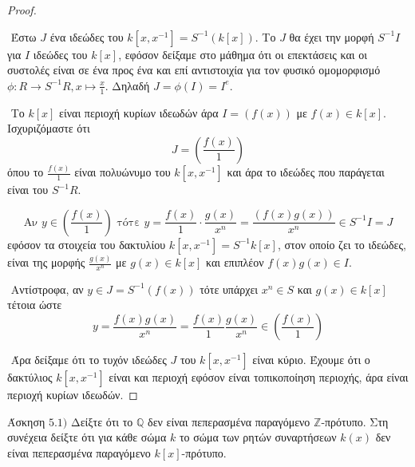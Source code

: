 \documentclass[oneside,a4paper]{article}
\begin{document}
\begin{proof} $ $
	
	$ $\newline
	Έστω $J$ ένα ιδεώδες του $k[x,x^{-1}] = S^{-1}(k[x])$. Το $J$ θα έχει την μορφή $S^{-1}I$ για $I$ ιδεώδες του $k[x]$, εφόσον δείξαμε στο μάθημα ότι οι επεκτάσεις και οι συστολές είναι σε ένα προς ένα και επί αντιστοιχία για τον φυσικό ομομορφισμό $\phi : R \rightarrow S^{-1}R, x \mapsto \frac x1$. Δηλαδή $J = \phi(I) = I^{e}$.

	$ $\newline
	Το $k[x]$ είναι περιοχή κυρίων ιδεωδών άρα $I = (f(x))$ με $f(x) \in k[x]$. Ισχυριζόμαστε ότι 
	$$J = \left(\frac{f(x)}{1}\right)$$
	όπου το $\frac{f(x)}{1}$ είναι πολυώνυμο του $k[x,x^{-1}]$ και άρα το ιδεώδες που παράγεται είναι του $S^{-1}R$.

	$$\text{Aν } y \in \left(\frac{f(x)}{1}\right) \text{ τότε }  y = \frac{f(x)}1 \cdot \frac{g(x)}{x^n} = \frac{\left(f(x)g(x)\right)}{x^n} \in S^{-1} I = J$$
	εφόσον τα στοιχεία του δακτυλίου $k[x,x^{-1}]=S^{-1}k[x]$, στον οποίο ζει το ιδεώδες, είναι της μορφής $\frac{g(x)}{x^n}$ με $g(x) \in k[x]$ και επιπλέον $f(x)g(x) \in I$. 


	$ $\newline
	Αντίστροφα, αν $y \in J = S^{-1}(f(x))$ τότε υπάρχει $x^n \in S$ και $g(x) \in k[x]$ τέτοια ώστε
	$$y = \frac{f(x)g(x)}{x^n} = \frac {f(x)}1 \frac{g(x)}{x^n} \in \left(\frac{f(x)}1\right)$$

	$ $\newline
	Άρα δείξαμε ότι το τυχόν ιδεώδες $J$ του $k[x,x^{-1}]$ είναι κύριο. Έχουμε ότι ο δακτύλιος $k[x,x^{-1}]$ είναι και περιοχή εφόσον είναι τοπικοποίηση περιοχής, άρα είναι περιοχή κυρίων ιδεωδών. 


\end{proof}


\pagebreak


\noindent Άσκηση $5.1)$
\quad Δείξτε ότι το $\mathbb{Q}$ δεν είναι πεπερασμένα παραγόμενο $\mathbb{Z}$-πρότυπο. Στη συνέχεια δείξτε ότι για κάθε σώμα $k$ το σώμα των ρητών συναρτήσεων $k(x)$ δεν είναι πεπερασμένα παραγόμενο $k[x]$-πρότυπο.
\end{document}
